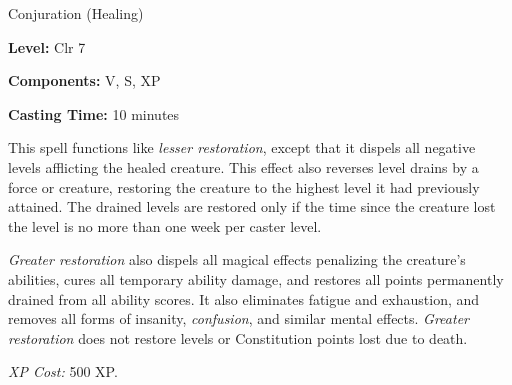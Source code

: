 \label{spell:Greater Restoration}

Conjuration (Healing)

\textbf{Level:} Clr 7

\textbf{Components:} V, S, XP

\textbf{Casting Time:} 10 minutes

This spell functions like \textit{lesser restoration}, except that it dispels all 
negative levels afflicting the healed creature. This effect also reverses level 
drains by a force or creature, restoring the creature to the highest level it had 
previously attained. The drained levels are restored only if the time since the 
creature lost the level is no more than one week per caster level.

\textit{Greater restoration} also dispels all magical effects penalizing the creature's 
abilities, cures all temporary ability damage, and restores all points permanently 
drained from all ability scores. It also eliminates fatigue and exhaustion, and 
removes all forms of insanity, \textit{confusion}, and similar mental effects. 
\textit{Greater restoration} does not restore levels or Constitution points lost 
due to death.

\textit{XP Cost:} 500 XP.

